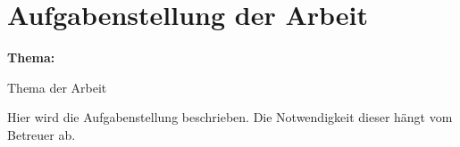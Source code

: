 \chapter*{Aufgabenstellung der Arbeit}

{\large \textbf{Thema:} \parbox[t]{0.8\textwidth}{Thema der Arbeit}}
\newline

Hier wird die Aufgabenstellung beschrieben. Die Notwendigkeit dieser hängt vom Betreuer ab.
